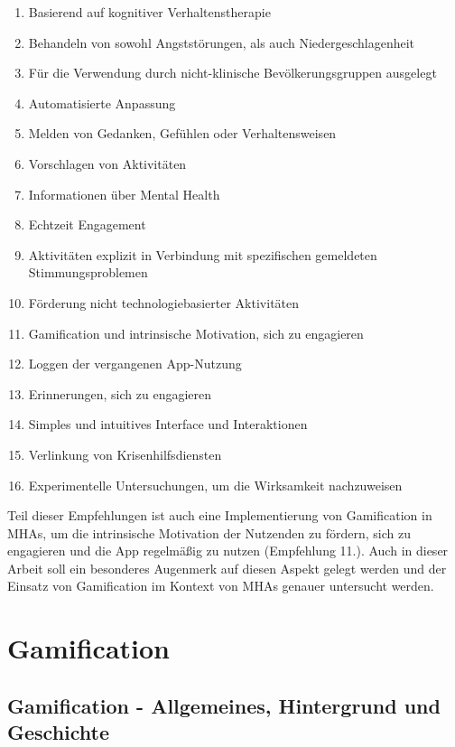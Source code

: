 \begin{enumerate}
    \item{Basierend auf kognitiver Verhaltenstherapie}
    \item{Behandeln von sowohl Angststörungen, als auch Niedergeschlagenheit}
    \item{Für die Verwendung durch nicht-klinische Bevölkerungsgruppen ausgelegt}
    \item{Automatisierte Anpassung}
    \item{Melden von Gedanken, Gefühlen oder Verhaltensweisen}
    \item{Vorschlagen von Aktivitäten}
    \item{Informationen über Mental Health}
    \item{Echtzeit Engagement}
    \item{Aktivitäten explizit in Verbindung mit spezifischen gemeldeten Stimmungsproblemen}
    \item{Förderung nicht technologiebasierter Aktivitäten}
    \item{Gamification und intrinsische Motivation, sich zu engagieren}
    \item{Loggen der vergangenen App-Nutzung}
    \item{Erinnerungen, sich zu engagieren}
    \item{Simples und intuitives Interface und Interaktionen}
    \item{Verlinkung von Krisenhilfsdiensten}
    \item{Experimentelle Untersuchungen, um die Wirksamkeit nachzuweisen}
\end{enumerate}

Teil dieser Empfehlungen ist auch eine Implementierung von Gamification in MHAs, 
um die intrinsische Motivation der Nutzenden zu fördern, sich zu engagieren und die App 
regelmäßig zu nutzen (Empfehlung 11.). Auch in dieser Arbeit soll ein besonderes Augenmerk auf 
diesen Aspekt gelegt werden und der Einsatz von Gamification im Kontext von MHAs genauer untersucht werden.



\section{Gamification}\label{subsec:gamification}



\subsection{Gamification - Allgemeines, Hintergrund und Geschichte}\label{subsubsec:gamification_allgemein}

